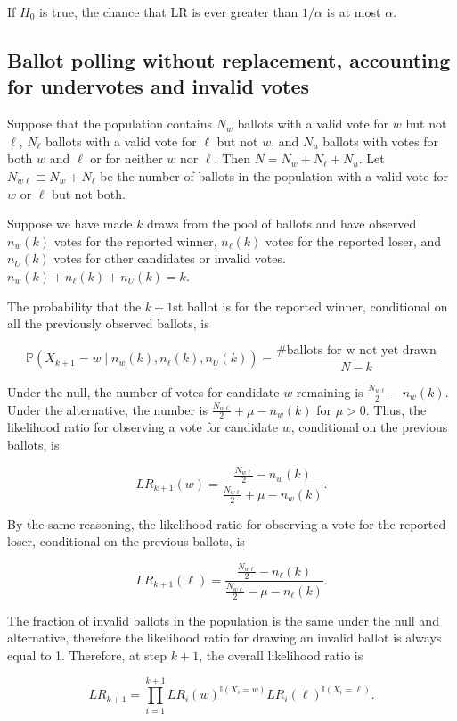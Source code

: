 \documentclass[12pt]{article}
\begin{document}
If $H_0$ is true, the chance that $\mbox{LR}$ is ever greater than $1/\alpha$
is at most $\alpha$.

\subsection{Ballot polling without replacement, accounting for undervotes and invalid votes}
Suppose that the population contains $N_w$ ballots with a valid vote for $w$ but not $\ell$,
$N_\ell$ ballots with a valid vote for $\ell$ but not $w$, and $N_u$ ballots with votes for both
$w$ and $\ell$ or for neither $w$ nor $\ell$.
Then $N = N_w + N_\ell + N_u$.
Let $N_{w\ell} \equiv N_w + N_\ell$ be the number of ballots in the 
population with a valid vote for $w$ or $\ell$ but not both.

Suppose we have made $k$ draws from the pool of ballots and have observed $n_w(k)$ votes for the reported winner, 
$n_\ell(k)$ votes for the reported loser, 
and $n_U(k)$ votes for other candidates or invalid votes.
$n_w(k)+n_\ell(k)+n_U(k) = k$.

The probability that the $k+1$st ballot is for the reported winner, conditional on all the previously observed ballots, is

$$\mathbb{P}(X_{k+1} = w \mid  n_w(k), n_\ell(k), n_U(k)) = \frac{\text{\# ballots for w not yet drawn}}{N - k}$$

Under the null, the number of votes for candidate $w$ remaining is $\frac{N_{w\ell}}{2} - n_w(k)$.  
Under the alternative, the number is $\frac{N_{w\ell}}{2} + \mu - n_w(k)$ for $\mu > 0$.
Thus, the likelihood ratio for observing a vote for candidate $w$, conditional on the previous ballots, is

$$LR_{k+1}(w) = \frac{\frac{N_{w\ell}}{2} - n_w(k)}{\frac{N_{w\ell}}{2}+\mu - n_w(k)}.$$

By the same reasoning, the likelihood ratio for observing a vote for the reported loser, conditional on the previous ballots, is

$$LR_{k+1}(\ell) = \frac{\frac{N_{w\ell}}{2} - n_\ell(k)}{\frac{N_{w\ell}}{2}-\mu - n_\ell(k)}.$$

The fraction of invalid ballots in the population is the same under the null and alternative, therefore the likelihood ratio for drawing an invalid ballot is always equal to 1. Therefore, at step $k+1$, the overall likelihood ratio is

$$LR_{k+1} = \prod_{i=1}^{k+1} LR_i(w)^{\mathbb{I}(X_i= w)}LR_i(\ell)^{\mathbb{I}(X_i = \ell)}.$$
\end{document}
